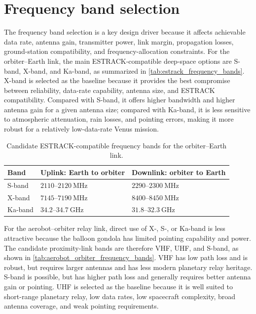 \section{Frequency band selection}
The frequency band selection is a key design driver because it affects achievable data rate, antenna gain, transmitter power, link margin, propagation losses, ground-station compatibility, and frequency-allocation constraints. For the orbiter--Earth link, the main ESTRACK-compatible deep-space options are S-band, X-band, and Ka-band, as summarized in \autoref{tab:estrack_frequency_bands}. X-band is selected as the baseline because it provides the best compromise between reliability, data-rate capability, antenna size, and ESTRACK compatibility. Compared with S-band, it offers higher bandwidth and higher antenna gain for a given antenna size; compared with Ka-band, it is less sensitive to atmospheric attenuation, rain losses, and pointing errors, making it more robust for a relatively low-data-rate Venus mission.

\begin{table}[H]
    \centering
    \small
    \caption{Candidate ESTRACK-compatible frequency bands for the orbiter--Earth link.}
    \label{tab:estrack_frequency_bands}
    \begin{tabular}{p{} p{} p{}}
        \hline
        \textbf{Band} & \textbf{Uplink: Earth to orbiter} & \textbf{Downlink: orbiter to Earth} \\
        \hline
        S-band & $2110$--$2120~\mathrm{MHz}$ & $2290$--$2300~\mathrm{MHz}$ \\
        \hline
        X-band & $7145$--$7190~\mathrm{MHz}$ & $8400$--$8450~\mathrm{MHz}$ \\
        \hline
        Ka-band & $34.2$--$34.7~\mathrm{GHz}$ & $31.8$--$32.3~\mathrm{GHz}$ \\
        \hline
    \end{tabular}
\end{table}

For the aerobot--orbiter relay link, direct use of X-, S-, or Ka-band is less attractive because the balloon gondola has limited pointing capability and power. The candidate proximity-link bands are therefore VHF, UHF, and S-band, as shown in \autoref{tab:aerobot_orbiter_frequency_bands}. VHF has low path loss and is robust, but requires larger antennas and has less modern planetary relay heritage. S-band is possible, but has higher path loss and generally requires better antenna gain or pointing. UHF is selected as the baseline because it is well suited to short-range planetary relay, low data rates, low spacecraft complexity, broad antenna coverage, and weak pointing requirements.

